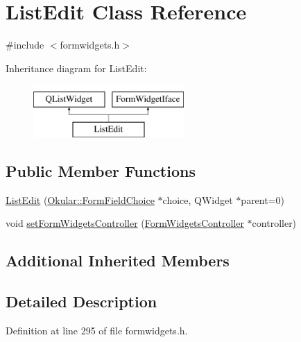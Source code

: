 \hypertarget{classListEdit}{\section{List\+Edit Class Reference}
\label{classListEdit}
}


{\ttfamily \#include $<$formwidgets.\+h$>$}

Inheritance diagram for List\+Edit\+:\begin{figure}[H]
\begin{center}
\leavevmode
\includegraphics[height=2.000000cm]{classListEdit}
\end{center}
\end{figure}
\subsection*{Public Member Functions}
\begin{DoxyCompactItemize}
\item 
\hyperlink{classListEdit_a322603b8f3b6175d0f5596641c259786}{List\+Edit} (\hyperlink{classOkular_1_1FormFieldChoice}{Okular\+::\+Form\+Field\+Choice} $\ast$choice, Q\+Widget $\ast$parent=0)
\item 
void \hyperlink{classListEdit_a0d007f72fbc501c97cde2c73c01c65ea}{set\+Form\+Widgets\+Controller} (\hyperlink{classFormWidgetsController}{Form\+Widgets\+Controller} $\ast$controller)
\end{DoxyCompactItemize}
\subsection*{Additional Inherited Members}


\subsection{Detailed Description}


Definition at line 295 of file formwidgets.\+h.



